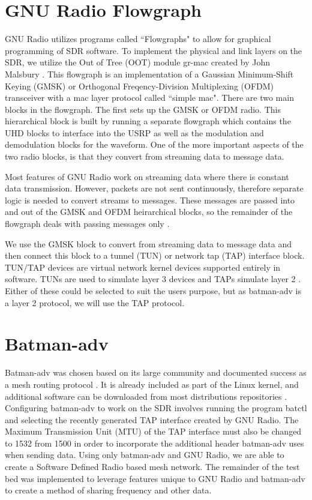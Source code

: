 \section{GNU Radio Flowgraph}

GNU Radio utilizes programs called ``Flowgraphs" to allow for graphical programming of SDR software. To implement the physical and link layers on the SDR, we utilize the Out of Tree (OOT) module gr-mac created by John Malsbury \cite{0015}. This flowgraph is an implementation of a Gaussian Minimum-Shift Keying (GMSK) or Orthogonal Freqency-Division Multiplexing (OFDM) transceiver with a mac layer protocol called ``simple mac". There are two main blocks in the flowgraph. The first sets up the GMSK or OFDM radio. This hierarchical block is built by running a separate flowgraph which contains the UHD blocks to interface into the USRP as well as the modulation and demodulation blocks for the waveform. One of the more important aspects of the two radio blocks, is that they convert from streaming data to message data. 

Most features of GNU Radio work on streaming data where there is constant data transmission. However, packets are not sent continuously, therefore separate logic is needed to convert streams to messages. These messages are passed into and out of the GMSK and OFDM heirarchical blocks, so the remainder of the flowgraph deals with passing messages only \cite{6737601}. 

We use the GMSK block to convert from streaming data to message data and then connect this block to a tunnel (TUN) or network tap (TAP) interface block. TUN/TAP devices are virtual network kernel devices supported entirely in software. TUNs are used to simulate layer 3 devices and TAPs simulate layer 2 \cite{0017}. Either of these could be selected to suit the users purpose, but as batman-adv is a layer 2 protocol, we will use the TAP protocol.

\section{Batman-adv}

Batman-adv was chosen based on its large community and documented success as a mesh routing protocol \cite{5375690}. It is already included as part of the Linux kernel, and additional software can be downloaded from most distributions repositories \cite{0008}. Configuring batman-adv to work on the SDR involves running the program batctl and selecting the recently generated TAP interface created by GNU Radio. The Maximum Transmission Unit (MTU) of the TAP interface must also be changed to 1532 from 1500 in order to incorporate the additional header batman-adv uses when sending data. Using only batman-adv and GNU Radio, we are able to create a Software Defined Radio based mesh network. The remainder of the test bed was implemented to leverage features unique to GNU Radio and batman-adv to create a method of sharing frequency and other data. 

